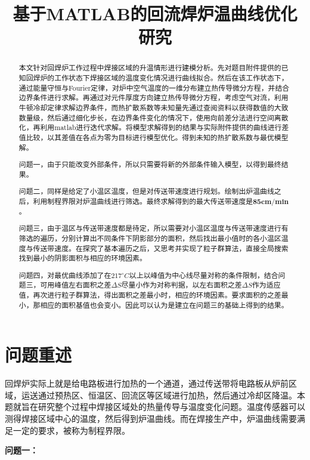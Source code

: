 \documentclass[withoutpreface,bwprint]{cumcmthesis} %
\title{基于MATLAB的回流焊炉温曲线优化研究}
\begin{document}
 \maketitle
 \begin{abstract}
 本文针对回焊炉工作过程中焊接区域的升温情形进行建模分析。先对题目附件提供的已知回焊炉的工作状态下焊接区域的温度变化情况进行曲线拟合。然后在该工作状态下，通过能量守恒与Fourier定律，对炉中空气温度的一维分布建立热传导微分方程，并结合边界条件进行求解。再通过对元件厚度方向建立热传导微分方程，考虑空气对流，利用牛顿冷却定律求解边界条件，而热扩散系数等未知量先通过查阅资料以获得数值的大致数量级，然后通过细化步长，在边界条件变化的情况下，使用向前差分法进行空间离散化，再利用matlab进行迭代求解。将模型求解得到的结果与实际附件提供的曲线进行差值比较，以其差值在各点为零为目标进行模型优化。得到未知的热扩散系数与最优模型解。
 
 问题一，由于只能改变外部条件，所以只需要将新的外部条件输入模型，以得到最终结果。
 
 问题二，同样是给定了小温区温度，但是对传送带速度进行规划。绘制出炉温曲线之后，利用制程界限对炉温曲线进行筛选。最终求解得到的最大传送带速度是$\textbf{85cm/min}$。
 
 问题三，由于温区与传送带速度都是待定，所以需要对小温区温度与传送带速度进行有筛选的遍历，分别计算出不同条件下阴影部分的面积，然后找出最小值时的各小温区温度与传送带速度。在探究了基本遍历之后，又思考并实现了粒子群算法，直接全局搜索找到最小的阴影面积与相应的环境因素。
 
 问题四，对最优曲线添加了在$217^{\circ}C$以上以峰值为中心线尽量对称的条件限制，结合问题三，可用峰值左右面积之差$\Delta S$尽量小作为对称判据，以左右面积之差$\Delta S$作为适应值，再次进行粒子群算法，得出面积之差最小时，相应的环境因素。要求面积的之差最小，那相应的面积基值也会变小。因此可以认为是建立在问题三的基础上得到的结果。
 
\end{abstract}





\section{问题重述}
回焊炉实际上就是给电路板进行加热的一个通道，通过传送带将电路板从炉前区域，运送通过预热区、恒温区、回流区等区域进行加热，然后通过冷却区降温。本题就旨在研究整个过程中焊接区域处的热量传导与温度变化问题。温度传感器可以测得焊接区域中心的温度，然后得到炉温曲线。而在焊接生产中，炉温曲线需要满足一定的要求，被称为制程界限。
\begin{flushleft}
\textbf{问题一：}
\end{flushleft}
\end{document}
